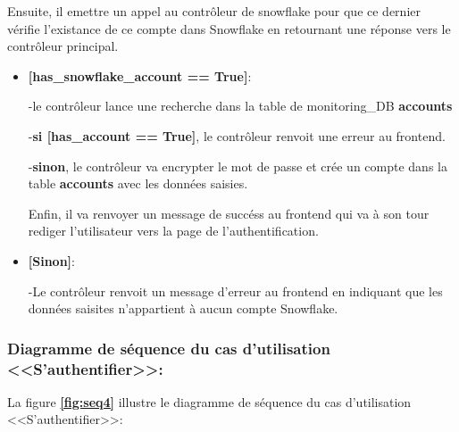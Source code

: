     \par Ensuite, il emettre un appel au contrôleur de snowflake pour que ce dernier vérifie l'existance de ce compte dans Snowflake en retournant une réponse vers le contrôleur principal. 
    \begin{itemize}
        \item \textbf{[has\_snowflake\_account == True]}:
       \par -le contrôleur lance une recherche dans la table de monitoring\_DB \textbf{accounts}
       \par -\textbf{si [has\_account == True]}, le contrôleur renvoit une erreur au frontend.
       \par -\textbf{sinon}, le contrôleur va encrypter le mot de passe et crée un compte dans la table \textbf{accounts} avec les données saisies.
       \par Enfin, il va renvoyer un message de succéss au frontend qui va à son tour rediger l'utilisateur vers la page de l'authentification. 
       \item \textbf{[Sinon]}: 
       \par -Le contrôleur renvoit un message d'erreur au frontend en indiquant que les données saisites n'appartient à aucun compte Snowflake.
    \end{itemize}
    \subsubsection{Diagramme de séquence du cas d'utilisation <<S'authentifier>>:}
    \par La figure \textbf{\ref*{fig:seq4}} illustre le diagramme de séquence du cas d'utilisation <<S'authentifier>>:

